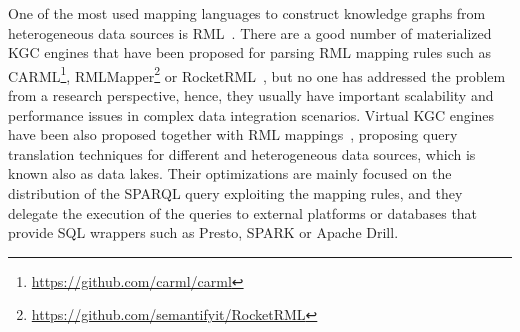 One of the most used mapping languages to construct knowledge graphs from heterogeneous data sources is RML~\citep{dimou2014rml}. There are a good number of materialized KGC engines that have been proposed for parsing RML mapping rules such as CARML\footnote{\url{https://github.com/carml/carml}}, RMLMapper\footnote{\url{https://github.com/semantifyit/RocketRML}} or RocketRML~\citep{csimcsek2019rocketrml}, but no one has addressed the problem from a research perspective, hence, they usually have important scalability and performance issues in complex data integration scenarios. Virtual KGC engines have been also proposed together with RML mappings~\citep{endris2019ontario,mami2019squerall}, proposing query translation techniques for different and heterogeneous data sources, which is known also as data lakes. Their optimizations are mainly focused on the distribution of the SPARQL query exploiting the mapping rules, and they delegate the execution of the queries to external platforms or databases that provide SQL wrappers such as Presto, SPARK or Apache Drill.

